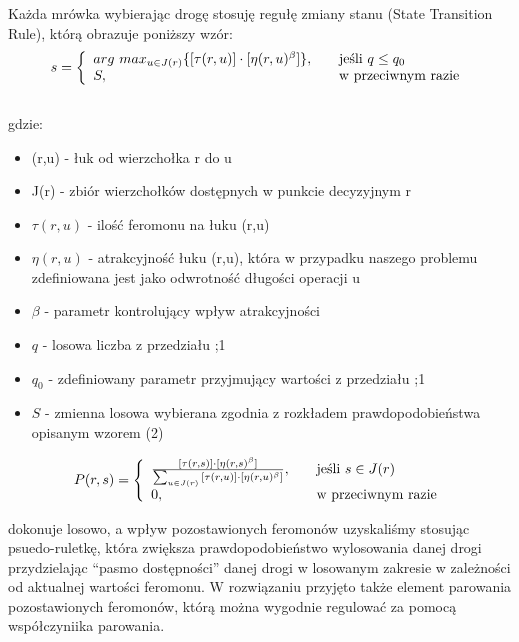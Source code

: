 \documentclass[10pt,a4paper]{article}
\begin{document}
Każda mrówka wybierając drogę stosuję regułę zmiany stanu (State Transition Rule), którą obrazuje poniższy wzór:\\
\begin{equation}
 s = \left\{ 
  \begin{array}{l l}
    arg\ max_{u \in J(r)} \{ [\tau (r,u)] \cdot [\eta (r,u)^\beta] \} , & \quad \text{jeśli $q\leq q_0$}\\
    S, & \quad \text{w przeciwnym razie}
  \end{array} \right.
\end{equation} \\
gdzie:
\begin{itemize}
  \item (r,u) - łuk od wierzchołka r do u
  \item J(r) - zbiór wierzchołków dostępnych w punkcie decyzyjnym r
  \item $ \tau (r,u) $ - ilość feromonu na łuku (r,u)
  \item $ \eta (r,u) $ - atrakcyjność łuku (r,u), która w przypadku naszego problemu zdefiniowana jest jako odwrotność długości operacji u
  \item $ \beta $ - parametr kontrolujący wpływ atrakcyjności
  \item $ q $ - losowa liczba z przedziału ;1 \rangle 
  \item $ q_0 $ - zdefiniowany parametr przyjmujący wartości z przedziału ;1 \rangle
  \item $ S $ - zmienna losowa wybierana zgodnia z rozkładem prawdopodobieństwa opisanym wzorem (2)
\end{itemize}

\begin{equation}
 P(r,s) = \left\{ 
  \begin{array}{l l}
    \frac{[\tau (r,s)] \cdot [\eta (r,s)^\beta]}{\sum_{u \in J(r)} {[\tau (r,u)]
    \cdot [\eta (r,u)^\beta]}},
    & \quad \text{jeśli }s \in J(r)\\
     0, & \quad \text{w przeciwnym razie}
  \end{array} \right.
\end{equation}

dokonuje losowo, a wpływ pozostawionych feromonów uzyskaliśmy stosując
psuedo-ruletkę, która zwiększa prawdopodobieństwo wylosowania danej drogi
przydzielając “pasmo dostępności” danej drogi w losowanym zakresie w zależności
od aktualnej wartości feromonu.  W rozwiązaniu przyjęto także element parowania
pozostawionych feromonów, którą można wygodnie regulować za pomocą współczyniika
parowania.
\end{document}
